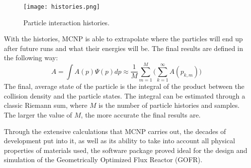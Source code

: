 \begin{figure}[!htbp]
\centering
\texttt{[image: histories.png]}
\caption{Particle interaction histories.}
\label{fig:histories}
\end{figure}
With the histories, MCNP is able to extrapolate where the particles will end up after future runs and what their energies will be. The final results are defined in the following way:
\begin{equation*}
A = \int A(p)\Psi(p)dp \approx \frac{1}{M}\sum_{m=1}^M\Big(\sum_{k=1}^\infty A(p_{k,m})\Big)
\end{equation*}
The final, average state of the particle is the integral of the product between the collision density and the particle states. The integral can be estimated through a classic Riemann sum, where $M$ is the number of particle histories and samples. The larger the value of $M$, the more accurate the final results are. 

Through the extensive calculations that MCNP carries out, the decades of development put into it, as well as its ability to take into account all physical properties of materials used, the software package proved ideal for the design and simulation of the Geometrically Optimized Flux Reactor (GOFR).
